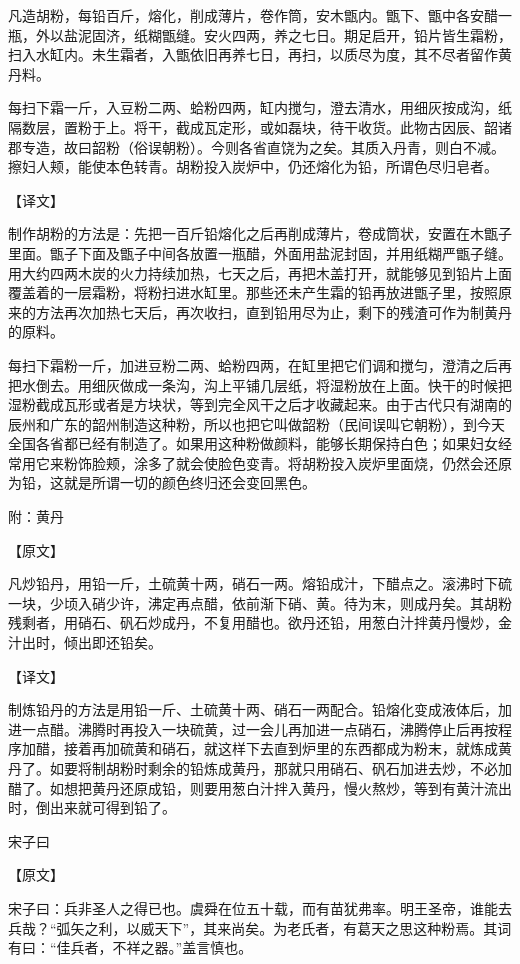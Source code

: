\documentclass[12pt,UTF8]{ctexbook}
\begin{document}
凡造胡粉，每铅百斤，熔化，削成薄片，卷作筒，安木甑内。甑下、甑中各安醋一瓶，外以盐泥固济，纸糊甑缝。安火四两，养之七日。期足启开，铅片皆生霜粉，扫入水缸内。未生霜者，入甑依旧再养七日，再扫，以质尽为度，其不尽者留作黄丹料。

每扫下霜一斤，入豆粉二两、蛤粉四两，缸内搅匀，澄去清水，用细灰按成沟，纸隔数层，置粉于上。将干，截成瓦定形，或如磊块，待干收货。此物古因辰、韶诸郡专造，故曰韶粉（俗误朝粉）。今则各省直饶为之矣。其质入丹青，则白不减。擦妇人颊，能使本色转青。胡粉投入炭炉中，仍还熔化为铅，所谓色尽归皂者。

【译文】

制作胡粉的方法是：先把一百斤铅熔化之后再削成薄片，卷成筒状，安置在木甑子里面。甑子下面及甑子中间各放置一瓶醋，外面用盐泥封固，并用纸糊严甑子缝。用大约四两木炭的火力持续加热，七天之后，再把木盖打开，就能够见到铅片上面覆盖着的一层霜粉，将粉扫进水缸里。那些还未产生霜的铅再放进甑子里，按照原来的方法再次加热七天后，再次收扫，直到铅用尽为止，剩下的残渣可作为制黄丹的原料。

每扫下霜粉一斤，加进豆粉二两、蛤粉四两，在缸里把它们调和搅匀，澄清之后再把水倒去。用细灰做成一条沟，沟上平铺几层纸，将湿粉放在上面。快干的时候把湿粉截成瓦形或者是方块状，等到完全风干之后才收藏起来。由于古代只有湖南的辰州和广东的韶州制造这种粉，所以也把它叫做韶粉（民间误叫它朝粉），到今天全国各省都已经有制造了。如果用这种粉做颜料，能够长期保持白色；如果妇女经常用它来粉饰脸颊，涂多了就会使脸色变青。将胡粉投入炭炉里面烧，仍然会还原为铅，这就是所谓一切的颜色终归还会变回黑色。

附：黄丹

【原文】

凡炒铅丹，用铅一斤，土硫黄十两，硝石一两。熔铅成汁，下醋点之。滚沸时下硫一块，少顷入硝少许，沸定再点醋，依前渐下硝、黄。待为末，则成丹矣。其胡粉残剩者，用硝石、矾石炒成丹，不复用醋也。欲丹还铅，用葱白汁拌黄丹慢炒，金汁出时，倾出即还铅矣。

【译文】

制炼铅丹的方法是用铅一斤、土硫黄十两、硝石一两配合。铅熔化变成液体后，加进一点醋。沸腾时再投入一块硫黄，过一会儿再加进一点硝石，沸腾停止后再按程序加醋，接着再加硫黄和硝石，就这样下去直到炉里的东西都成为粉末，就炼成黄丹了。如要将制胡粉时剩余的铅炼成黄丹，那就只用硝石、矾石加进去炒，不必加醋了。如想把黄丹还原成铅，则要用葱白汁拌入黄丹，慢火熬炒，等到有黄汁流出时，倒出来就可得到铅了。

宋子曰

【原文】

宋子曰：兵非圣人之得已也。虞舜在位五十载，而有苗犹弗率。明王圣帝，谁能去兵哉？“弧矢之利，以威天下”，其来尚矣。为老氏者，有葛天之思这种粉焉。其词有曰：“佳兵者，不祥之器。”盖言慎也。
\end{document}
